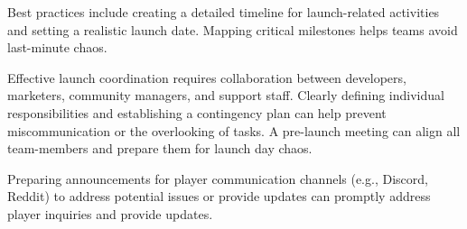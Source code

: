 Best practices include creating a detailed timeline for launch-related activities and setting a realistic launch date. Mapping critical milestones helps teams avoid last-minute chaos.
\cite{edgegap_pre-launch-list}

Effective launch coordination requires collaboration between developers, marketers, community managers, and support staff. Clearly defining individual responsibilities and establishing a contingency plan can help prevent miscommunication or the overlooking of tasks. A pre-launch meeting can align all team-members and prepare them for launch day chaos.
\cite{palmer_planning-launch, edgegap_pre-launch-list}

Preparing announcements for player communication channels (e.g., Discord, Reddit) to address potential issues or provide updates can promptly address player inquiries and provide updates.
\cite{palmer_planning-launch, edgegap_pre-launch-list}
